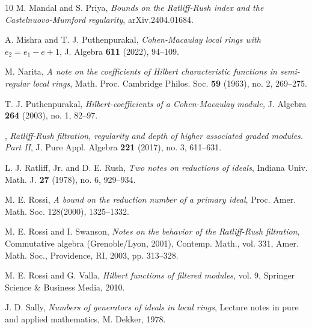 \documentclass[11pt]{amsart}
\theoremstyle{plain}
\theoremstyle{plain}
\begin{document}
\begin{thebibliography}{10}
 M. Mandal and S. Priya, \emph{Bounds on the Ratliff-Rush index and the Castelnuovo-Mumford regularity},  arXiv.2404.01684.

A. Mishra and T. J. Puthenpurakal, \emph{Cohen-Macaulay local rings with $e_2= e_1-e+1$}, J. Algebra \textbf{611} (2022), 94–109.

M. Narita, \emph{A note on the coefficients of Hilbert characteristic functions in semi-regular local rings}, Math. Proc. Cambridge Philos. Soc. \textbf{59} (1963), no. 2, 269–275.


 T. J. Puthenpurakal, \emph{Hilbert-coefficients of a Cohen-Macaulay module,} J. Algebra \textbf{264} (2003), no. 1, 82–97.


\bysame, \emph{Ratliff-Rush filtration, regularity and depth of higher associated graded modules. Part II}, J. Pure Appl. Algebra \textbf{221} (2017), no. 3, 611–631.


L. J. Ratliff, Jr. and D. E. Rush, \emph{Two notes on reductions of ideals}, Indiana Univ. Math. J. \textbf{27} (1978), no. 6, 929–934.

 M. E. Rossi, \textit{A bound on the reduction number of a primary ideal}, Proc. Amer. Math. Soc. 128(2000),
1325–1332.


 M. E. Rossi and I. Swanson, \emph{Notes on the behavior of the Ratliff-Rush filtration}, Commutative algebra (Grenoble/Lyon, 2001), Contemp. Math., vol. 331, Amer. Math. Soc., Providence, RI, 2003, pp. 313–328.

M. E. Rossi and G. Valla, \emph{Hilbert functions of filtered modules}, vol. 9, Springer Science \& Business Media, 2010.

 J. D. Sally, \emph{Numbers of generators of ideals in local rings}, Lecture notes in pure and applied mathematics, M. Dekker, 1978.


\end{thebibliography}
\end{document}
